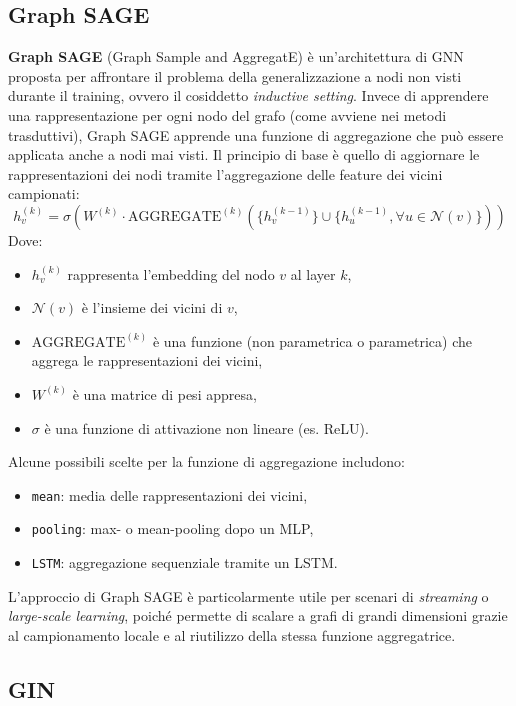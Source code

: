 \subsection{Graph SAGE}

\textbf{Graph SAGE} (Graph Sample and AggregatE) è un'architettura di GNN proposta per affrontare il problema della generalizzazione a nodi non visti durante il training, ovvero il cosiddetto \textit{inductive setting}. Invece di apprendere una rappresentazione per ogni nodo del grafo (come avviene nei metodi trasduttivi), Graph SAGE apprende una funzione di aggregazione che può essere applicata anche a nodi mai visti. Il principio di base è quello di aggiornare le rappresentazioni dei nodi tramite l'aggregazione delle feature dei vicini campionati:
\[
    h_v^{(k)} = \sigma\left(W^{(k)} \cdot \text{AGGREGATE}^{(k)}\left(\{h_v^{(k-1)}\} \cup \{h_u^{(k-1)}, \forall u \in \mathcal{N}(v)\}\right)\right)
\]
Dove:
\begin{itemize}
    \item \( h_v^{(k)} \) rappresenta l'embedding del nodo \( v \) al layer \( k \),
    \item \( \mathcal{N}(v) \) è l'insieme dei vicini di \( v \),
    \item \( \text{AGGREGATE}^{(k)} \) è una funzione (non parametrica o parametrica) che aggrega le rappresentazioni dei vicini,
    \item \( W^{(k)} \) è una matrice di pesi appresa,
    \item \( \sigma \) è una funzione di attivazione non lineare (es. ReLU).
\end{itemize}

Alcune possibili scelte per la funzione di aggregazione includono:
\begin{itemize}
    \item \texttt{mean}: media delle rappresentazioni dei vicini,
    \item \texttt{pooling}: max- o mean-pooling dopo un MLP,
    \item \texttt{LSTM}: aggregazione sequenziale tramite un LSTM.
\end{itemize}

L’approccio di Graph SAGE è particolarmente utile per scenari di \textit{streaming} o \textit{large-scale learning}, poiché permette di scalare a grafi di grandi dimensioni grazie al campionamento locale e al riutilizzo della stessa funzione aggregatrice.

\subsection{GIN}

